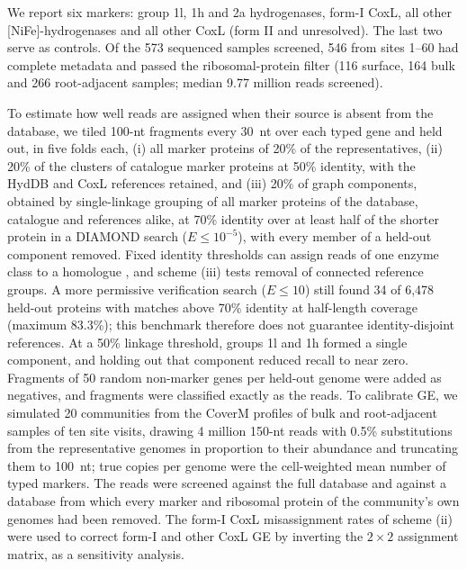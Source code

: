 \documentclass[11pt]{article}
\begin{document}
We report six markers: group 1l, 1h and 2a hydrogenases, form-I CoxL, all other [NiFe]-hydrogenases and
all other CoxL (form II and unresolved). The last two serve as controls. Of the 573 sequenced samples
screened, 546 from sites 1--60 had complete metadata and passed the ribosomal-protein filter (116
surface, 164 bulk and 266 root-adjacent samples; median 9.77 million reads screened).

To estimate how well reads are assigned when their source is absent from the database, we tiled 100-nt
fragments every 30~nt over each typed gene and held out, in five folds each, (i) all marker proteins of
20\% of the representatives, (ii) 20\% of the clusters of catalogue marker proteins at 50\% identity, with
the HydDB and CoxL references retained, and (iii) 20\% of graph components, obtained by
single-linkage grouping of all marker proteins of the database, catalogue and references alike, at 70\%
identity over at least half of the shorter protein in a DIAMOND search ($E\leq10^{-5}$), with every member of a held-out component removed.
Fixed identity thresholds can assign reads of one enzyme class to a homologue \citep{orellana2017rocker},
and scheme (iii) tests removal of connected reference groups. A more permissive verification search
($E\leq10$) still found 34 of 6,478 held-out proteins with matches above 70\% identity at half-length
coverage (maximum 83.3\%); this benchmark therefore does not guarantee identity-disjoint references.
At a 50\% linkage
threshold, groups 1l and 1h formed a single component, and holding out that component reduced recall to near zero. Fragments
of 50 random non-marker genes per held-out genome were added as negatives, and fragments were classified
exactly as the reads. To calibrate GE, we simulated 20 communities from the CoverM profiles of bulk and
root-adjacent samples of ten site visits, drawing 4 million 150-nt reads with 0.5\% substitutions from the
representative genomes in proportion to their abundance and truncating them to 100~nt; true copies per
genome were the cell-weighted mean number of typed markers. The reads were screened against the full
database and against a database from which every marker and ribosomal protein of the community's own
genomes had been removed. The form-I CoxL misassignment rates of scheme (ii) were used to correct form-I
and other CoxL GE by inverting the $2\times2$ assignment matrix, as a sensitivity analysis.
\end{document}
